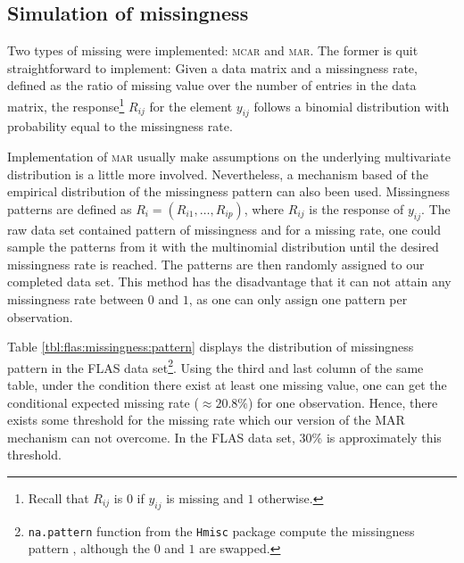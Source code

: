 \subsection{Simulation of missingness}

Two types of missing were implemented: \textsc{mcar} and \textsc{mar}. The
former is quit straightforward to implement: Given a data matrix and a
missingness rate, defined as the ratio of missing value over the number of
entries in the data matrix, the response\footnote{Recall that $R_{ij}$ is $0$
  if $y_{ij}$ is missing and $1$ otherwise.} $R_{ij}$ for the element $y_{ij}$
follows a binomial distribution with probability equal to the missingness rate.

Implementation of \textsc{mar} usually make assumptions on the underlying
multivariate distribution is a little more involved. Nevertheless, a mechanism
based of the empirical distribution of the missingness pattern can also been
used. Missingness patterns are defined as $R_{i} = (R_{i1}, \dots, R_{ip})$,
where $R_{ij}$ is the response of $y_{ij}$. The raw data set contained pattern
of missingness and for a missing rate, one could sample the patterns from it
with the multinomial distribution until the desired missingness rate is
reached. The patterns are then randomly assigned to our completed data
set. This method has the disadvantage that it can not attain any missingness
rate between $0$ and $1$, as one can only assign one pattern per observation.

Table \ref{tbl:flas:missingness:pattern} displays the distribution of
missingness pattern in the FLAS data set\footnote{ \texttt{na.pattern} function
  from the \texttt{Hmisc} package compute the missingness pattern , although
  the $0$ and $1$ are swapped.}. Using the third and last column of the same
table, under the condition there exist at least one missing value, one can get
the conditional expected missing rate ($\approx 20.8\%$) for one
observation. Hence, there exists some threshold for the missing rate which our
version of the MAR mechanism can not overcome. In the FLAS data set, 30\% is
approximately this threshold.

